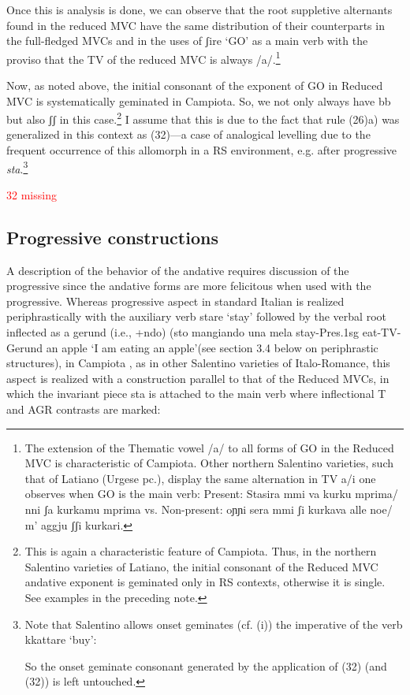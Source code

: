 \documentclass[output=paper,colorlinks,citecolor=brown,
]{langscibook}
\begin{document}
Once this is analysis is done, we can observe that the root suppletive alternants found in the reduced MVC have the same distribution of their counterparts in the full-fledged MVCs and in the uses of  ʃire ‘GO’ as a main verb with the proviso that the TV of the reduced MVC is always /a/.\footnote{The extension of the Thematic vowel /a/ to all forms of GO in the Reduced MVC is characteristic of Campiota.  Other northern  Salentino varieties, such that of Latiano (Urgese pc.), display the same alternation in TV a/i one observes when GO is the main verb: Present: Stasira mmi va kurku mprima/ nni ʃa kurkamu mprima vs. Non-present: oɲɲi sera mmi ʃi kurkava alle noe/ m’ aggju ʃʃi kurkari.}

Now, as noted above, the initial consonant of the exponent of GO in Reduced MVC is systematically geminated in Campiota.  So, we not only always have bb but also ʃʃ in this case.\footnote{
This is again a characteristic feature of Campiota.  Thus, in the northern Salentino varieties of Latiano, the initial consonant of the Reduced MVC andative exponent is geminated only in RS contexts, otherwise it is single.  See examples in the preceding note.} I assume that this is due to the fact that rule (26)a) was generalized in this context as (32)—a case of analogical levelling due to the frequent occurrence of this allomorph in a RS environment, e.g. after progressive \textit{sta}.\footnote{
Note that Salentino allows onset geminates (cf. (i)) the imperative of the verb kkattare ‘buy’:

\z

So the onset geminate consonant generated by the application of (32) (and (32))  is left untouched.
}

\ea \textcolor{red}{32 missing}
\z

\subsection{Progressive constructions}

A description of the behavior of the andative requires discussion of the progressive since the andative forms are more felicitous when used with the progressive.
Whereas progressive aspect in standard Italian is realized periphrastically with the auxiliary verb stare ‘stay’ followed by the verbal root inflected as a gerund (i.e., +ndo) (sto mangiando una mela  stay-Pres.1sg eat-TV-Gerund an apple ‘I am eating an apple’(see section 3.4 below on periphrastic structures), in Campiota , as in other Salentino varieties of Italo-Romance, this aspect is realized with a construction parallel to that of the Reduced MVCs,  in which the invariant piece sta is attached to the main verb where inflectional T and AGR contrasts are marked:
\end{document}
